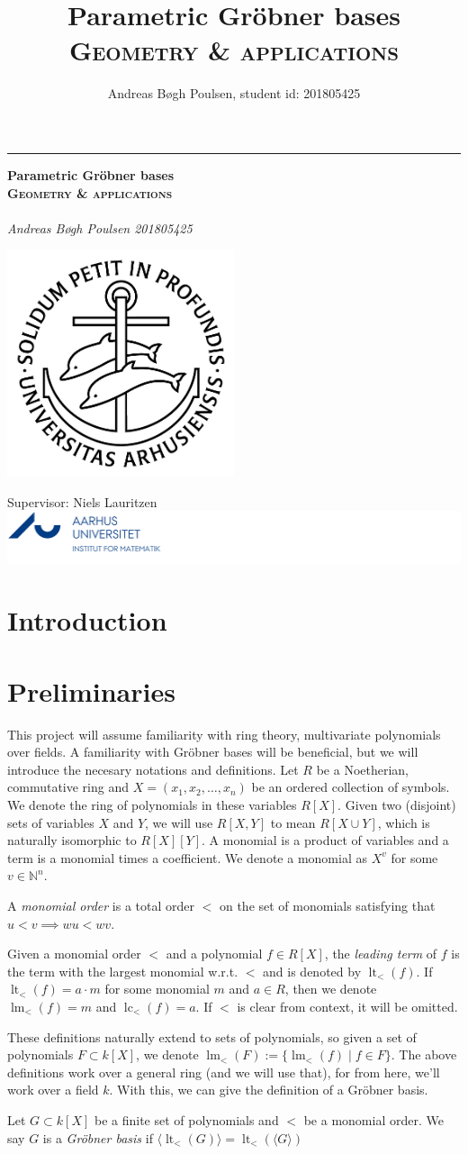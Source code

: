 \documentclass[a4paper, 12pt]{article}
\title{Parametric Gröbner bases\\{\large \textsc{Geometry \& applications}}}
\author{Andreas Bøgh Poulsen, student id: 201805425}
\newcommand{\N}{\mathbb{N}}
\DeclareMathOperator{\LT}{lt}
\DeclareMathOperator{\LM}{lm}
\DeclareMathOperator{\LC}{lc}
\theoremstyle{changedot}
\theoremstyle{changedotbreak}
\theoremstyle{nonumberplain}
\newcommand*{\titleGM}{%
\hspace*{0.2\textwidth} %
\rule{1pt}{\textheight} %
\hspace*{0.05\textwidth} %
\parbox[b]{0.75\textwidth}{ %
{\noindent\Huge\bfseries  Parametric Gröbner bases\\{\large \textsc{Geometry \& applications}}\\}\\[2\baselineskip] %
{\large \textit{Andreas Bøgh Poulsen \hfill 201805425 }}\\%
{\large } %
\parbox[b][0pt]{0.5\textwidth}{
  \hspace{2cm}\includegraphics[width=0.5\textwidth]{ausegl_sort.png}
  \vspace{-10cm}
}

\vspace{0.5\textheight} %
\vfill
{\noindent Supervisor: Niels Lauritzen \hspace{2.5cm} \includegraphics{AU_logo.png}  }\\[\baselineskip] %
}%
}
\begin{document}
\titleGM
\newpage
\tableofcontents

\newpage

\section*{Introduction}


\section{Preliminaries}
This project will assume familiarity with ring theory, multivariate polynomials over fields. A familiarity with Gröbner bases will be beneficial, but we will introduce the necesary notations and definitions. Let $R$ be a Noetherian, commutative ring and $X = (x_{1}, x_{2}, \dots, x_{n})$ be an ordered collection of symbols. We denote the ring of polynomials in these variables $R[X]$. Given two (disjoint) sets of variables $X$ and $Y$, we will use $R[X, Y]$ to mean $R[X \cup Y]$, which is naturally isomorphic to $R[X][Y]$. A monomial is a product of variables and a term is a monomial times a coefficient. We denote a monomial as $X^{v}$ for some $v \in \N^{n}$.

\begin{definition}
  A \textit{monomial order} is a total order $<$ on the set of monomials satisfying that $u < v \implies wu < wv$.

  Given a monomial order $<$ and a polynomial $f \in R[X]$, the \textit{leading term} of $f$ is the term with the largest monomial w.r.t. $<$ and is denoted by $\LT_{<}(f)$. If $\LT_{<}(f) = a\cdot m$ for some monomial $m$ and $a \in R$, then we denote $\LM_{<}(f) = m$ and $\LC_{<}(f) = a$. If $<$ is clear from context, it will be omitted.
\end{definition}

These definitions naturally extend to sets of polynomials, so given a set of polynomials $F \subset k[X]$, we denote $\LM_{<}(F) := \{\LM_{<}(f) \mid f \in F\}$. The above definitions work over a general ring (and we will use that), for from here, we'll work over a field $k$. With this, we can give the definition of a Gröbner basis.

\begin{definition}
  Let $G \subset k[X]$ be a finite set of polynomials and $<$ be a monomial order. We say $G$ is a \textit{Gröbner basis} if
  $\langle \LT_{<}(G) \rangle = \LT_{<}(\langle G \rangle )$
\end{definition}
\end{document}
